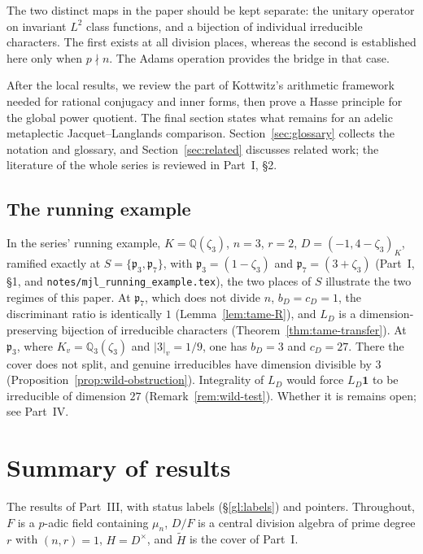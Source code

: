 \documentclass[11pt]{article}
\newcommand{\tH}{\widetilde H}
\theoremstyle{plain}
\theoremstyle{definition}
\begin{document}
The two distinct maps in the paper should be kept separate:
the unitary operator on invariant $L^2$ class functions, and a
bijection of individual irreducible characters. The first exists at
all division places, whereas the second is established here only
when $p\nmid n$. The Adams operation provides the bridge in that case.

After the local results, we review the part of Kottwitz's arithmetic
framework needed for rational conjugacy and inner forms, then prove
a Hasse principle for the global power quotient. The final section
states what remains for an adelic metaplectic Jacquet--Langlands
comparison. Section~\ref{sec:glossary} collects the notation and glossary, and Section~\ref{sec:related} discusses related work; the literature of the whole series is reviewed in Part~I, \S2.

\subsection*{The running example}
In the series' running example, $K=\mathbb{Q}(\zeta_3)$, $n=3$, $r=2$, $D=(-1,4-\zeta_3)_K$, ramified exactly at $S=\{\mathfrak p_3,\mathfrak p_7\}$, with $\mathfrak p_3=(1-\zeta_3)$ and $\mathfrak p_7=(3+\zeta_3)$ (Part~I, \S1, and \texttt{notes/mjl\_running\_example.tex}), the two places of $S$ illustrate the two regimes of this paper. At $\mathfrak p_7$, which does not divide $n$, $b_D=c_D=1$, the discriminant ratio is identically $1$ (Lemma~\ref{lem:tame-R}), and $L_D$ is a dimension-preserving bijection of irreducible characters (Theorem~\ref{thm:tame-transfer}). At $\mathfrak p_3$, where $K_v=\mathbb{Q}_3(\zeta_3)$ and $|3|_v=1/9$, one has $b_D=3$ and $c_D=27$. There the cover does not split, and genuine irreducibles have dimension divisible by $3$ (Proposition~\ref{prop:wild-obstruction}). Integrality of $L_D$ would force $L_D\mathbf 1$ to be irreducible of dimension $27$ (Remark~\ref{rem:wild-test}). Whether it is remains open; see Part~IV.

\section*{Summary of results}\label{sec:summary}
The results of Part~III, with status labels (\S\ref{gl:labels}) and pointers. Throughout, $F$ is a $p$-adic field containing $\mu_n$, $D/F$ is a central division algebra of prime degree $r$ with $(n,r)=1$, $H=D^\times$, and $\tH$ is the cover of Part~I.
\end{document}
